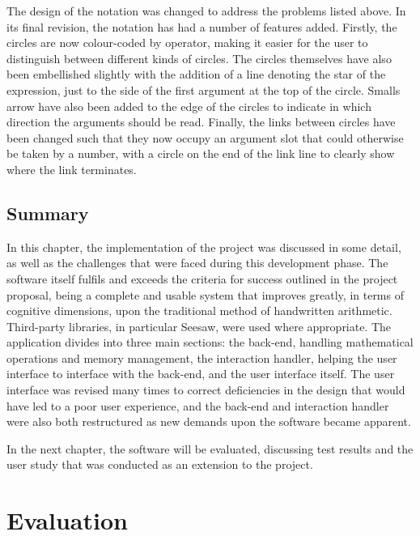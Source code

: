 \documentclass[12pt,twoside,notitlepage,xetex]{report}
\begin{document}

The design of the notation was changed to address the problems listed above.  In its
final revision, the notation has had a number of features added.  Firstly,
the circles are now colour-coded by operator, making it easier for the user to
distinguish between different kinds of circles.  The circles themselves have
also been embellished slightly with the addition of a line denoting the star of
the expression, just to the side of the first argument at the top of the
circle.  Smalls arrow have also been added to the edge of the circles to
indicate in which direction the arguments should be read.  Finally, the links
between circles have been changed such that they now occupy an argument slot
that could otherwise be taken by a number, with a circle on the end of the link
line to clearly show where the link terminates.


\section{Summary}

In this chapter, the implementation of the project was discussed in some
detail, as well as the challenges that were faced during this development
phase.  The software itself fulfils and exceeds the criteria for success
outlined in the project proposal, being a complete and usable system that
improves greatly, in terms of cognitive dimensions, upon the traditional method
of handwritten arithmetic.  Third-party libraries, in particular Seesaw, were
used where appropriate.  The application divides into three main sections: the
back-end, handling mathematical operations and memory management, the
interaction handler, helping the user interface to interface with the back-end,
and the user interface itself.  The user interface was revised many times to
correct deficiencies in the design that would have led to a poor user
experience, and the back-end and interaction handler were also both restructured
as new demands upon the software became apparent.

In the next chapter, the software will be evaluated, discussing test results
and the user study that was conducted as an extension to the project.

\cleardoublepage
\chapter{Evaluation}
\end{document}
